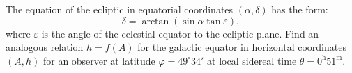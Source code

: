 The equation of the ecliptic in equatorial coordinates $(\alpha, \delta)$ has
the form:
\[ \delta = \arctan(\sin\alpha \tan\varepsilon), \]
where $\varepsilon$ is the angle of the celestial equator to the ecliptic
plane. Find an analogous relation $h = f(A)$ for the galactic equator in
horizontal coordinates $(A, h)$ for an observer at latitude
$\varphi = 49^\circ 34'$ at local sidereal time
$\theta = 0^{\mathrm{h}}51^{\mathrm{m}}$.
